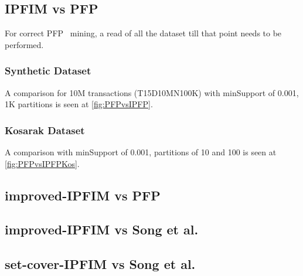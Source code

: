 %


\subsection{IPFIM vs PFP}
 For correct PFP~\cite{li2008pfp} mining, a read of all the dataset till that point needs to be performed.
\subsubsection{Synthetic Dataset}
A comparison for 10M transactions (T15D10MN100K) with minSupport of 0.001, 1K partitions is seen at \autoref{fig:PFPvsIPFP}.

\subsubsection{Kosarak Dataset}
A comparison with minSupport of 0.001, partitions of 10 and 100 is seen at \autoref{fig:PFPvsIPFPKos}.


%


\subsection{improved-IPFIM vs PFP}
\subsection{improved-IPFIM vs Song et al.}
\subsection{set-cover-IPFIM vs Song et al.}